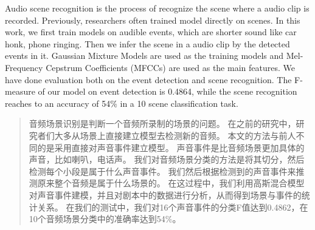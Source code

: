 
\begin{englishabstract}
Audio scene recognition is the process of recognize the scene where a audio clip is recorded. 
Previously, researchers often trained model directly on scenes. 
In this work, we first train models on audible events, which are shorter sound like car honk, phone ringing. 
Then we infer the scene in a audio clip by the detected events in it. 
Gaussian Mixture Models are used as the training models and Mel-Frequency Cepstrum Coefficients (MFCCs) are used as the main features. 
We have done evaluation both on the event detection and scene recognition. 
The F-measure of our model on event detection is 0.4864, while the scene recognition reaches to an accuracy of 54$\%$ in a 10 scene classification task.  \\  

\end{englishabstract}

\begin{abstract}
音频场景识别是判断一个音频所录制的场景的问题。
在之前的研究中，研究者们大多从场景上直接建立模型去检测新的音频。
本文的方法与前人不同的是采用直接对声音事件建立模型。
声音事件是比音频场景更加具体的声音，比如喇叭，电话声。
我们对音频场景分类的方法是将其切分，然后检测每个小段是属于什么声音事件。
我们然后根据检测到的声音事件来推测原来整个音频是属于什么场景的。 
在这过程中，我们利用高斯混合模型对声音事件建模，并且对剧本中的数据进行分析，从而得到场景与事件的统计关系。
在我们的测试中，我们对16个声音事件的分类F值达到0.4862，在10个音频场景分类中的准确率达到54$\%$。\\ 

\end{abstract}

